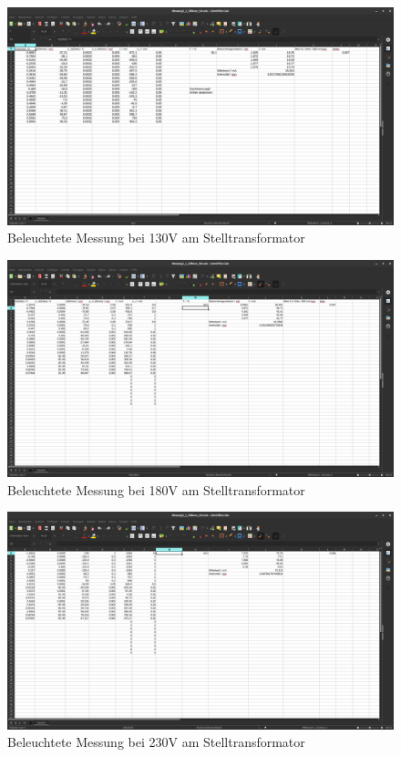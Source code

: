 \begin{figure}[h]
    \captionsetup{justification=centering,margin=2cm}
    \centering
    \includegraphics[angle = 90, width = 12cm]{Bilder/Daten/MessunngMonoSi130.png}
    \caption{Beleuchtete Messung bei 130V am Stelltransformator}
\end{figure}


\begin{figure}[h]
    \captionsetup{justification=centering,margin=2cm}
    \centering
    \includegraphics[angle = 90, width = 12cm]{Bilder/Daten/MessunngMonoSi180.png}
    \caption{Beleuchtete Messung bei 180V am Stelltransformator}
\end{figure}



\begin{figure}[h]
    \captionsetup{justification=centering,margin=2cm}
    \centering
    \includegraphics[angle = 90, width = 12cm]{Bilder/Daten/MessungMonoSi230.png}
    \caption{Beleuchtete Messung bei 230V am Stelltransformator}
\end{figure}









